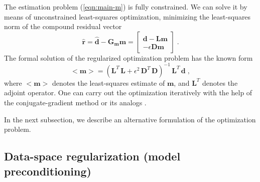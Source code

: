 The estimation problem (\ref{eqn:main-m}) is fully constrained. We can
solve it by means of unconstrained least-squares optimization,
minimizing the least-squares norm of
the compound residual vector
\begin{equation}
\hat{\mathbf{r}} = \hat{\mathbf{d}} - \mathbf{G_m m} =
\left[\begin{array}{c} \mathbf{d - L m}\\ - \epsilon \mathbf{D m}
  \end{array}\right]\;.
\label{eqn:rhat}
\end{equation}
The formal solution of the regularized optimization problem has the
known form \cite[]{parker}
\begin{equation}
  <\!\!\mathbf{m}\!\!> = 
  \left(\mathbf{L}^T\,\mathbf{L} +
    \epsilon^2\,\mathbf{D}^T\,\mathbf{D}\right)^{-1}\,\mathbf{L}^T\,\mathbf{d}\;,
  \label{eqn:minv1}  
\end{equation}
where $<\!\!\mathbf{m}\!\!>$ denotes the least-squares estimate of $\mathbf{m}$, 
and $\mathbf{L}^T$ denotes the adjoint operator.
One can carry out the optimization iteratively with the help of the
conjugate-gradient method \cite[]{Hestenes.1952} or its analogs
\cite[]{Paige.acm.8.195}.

In the next subsection, we describe an alternative formulation of the
optimization problem.

\subsection{Data-space regularization (model preconditioning)}


